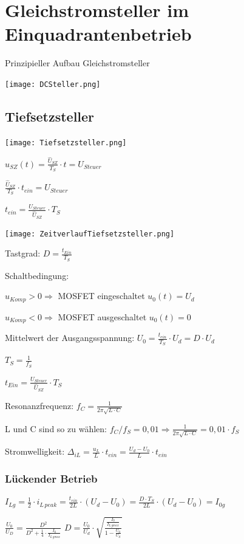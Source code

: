 \documentclass[german]{latex4ei/latex4ei_sheet}
\begin{document}
\section{Gleichstromsteller im Einquadrantenbetrieb}
	\begin{sectionbox}
		Prinzipieller Aufbau Gleichstromsteller

		\texttt{[image: DCSteller.png]}
		\subsection{Tiefsetzsteller}
			\begin{bluebox}
				\item \texttt{[image: Tiefsetzsteller.png]}
				\item $u_{SZ}(t) = \frac{\hat{U}_{SZ}}{T_S}\cdot t = U_{Steuer}$
				\item $\frac{\hat{U}_{SZ}}{T_S}\cdot t_{ein} = U_{Steuer}$
				\item $t_{ein} = \frac{U_{Steuer}}{\hat{U}_{SZ}}\cdot T_S$
				\item \texttt{[image: ZeitverlaufTiefsetzsteller.png]}
				\item Tastgrad: $D = \frac{t_{Ein}}{T_S}$
				\item Schaltbedingung:
				\item $u_{Komp} > 0 \Rightarrow $ MOSFET eingeschaltet $u_0(t) = U_d$
				\item $u_{Komp} < 0 \Rightarrow $ MOSFET ausgeschaltet $ u_0(t) = 0$
				\item Mittelwert der Ausgangsspannung: $U_0 = \frac{t_{ein}}{T_S}\cdot U_d = D \cdot U_d$
				\item $T_S = \frac{1}{f_S}$
				\item $t_{Ein} = \frac{U_{Steuer}}{\hat{U}_{SZ}}\cdot T_S$
				\item Resonanzfrequenz: $f_C = \frac{1}{2\pi \sqrt{L\cdot C}}$
				\item L und C sind so zu wählen: $f_C/f_S = 0,01\Rightarrow \frac{1}{2\pi\sqrt{L\cdot C}} = 0,01\cdot f_S$
				\item Stromwelligkeit: $\Delta_{iL} = \frac{u_L}{L}\cdot t_{ein} = \frac{U_d-U_0}{L}\cdot t_{ein}$
			\end{bluebox}
			\subsubsection{Lückender Betrieb}
				\begin{bluebox}
					\item $I_{Lg} = \frac{1}{2}\cdot i_{L\,peak} = \frac{t_{ein}}{2L}\cdot (U_d-U_0) = \frac{D\cdot T_S}{2L}\cdot (U_d-U_0) = I_{0g}$
					\item $\frac{U_0}{U_D} = \frac{D^2}{D^2+\frac{1}{4}\cdot \frac{I_0}{I_{L\,gmax}}}$
					\qquad $D = \frac{U_0}{U_d}\cdot \sqrt{\frac{\frac{I_0}{I_{L\,gmax}}}{1-\frac{U_0}{U_d}}}$
				\end{bluebox}	
	\end{sectionbox}
\end{document}
